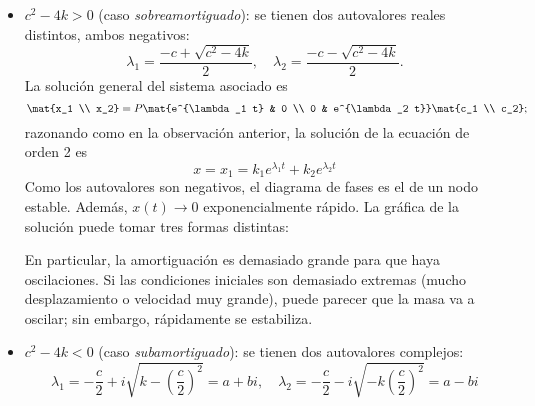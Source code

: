 \documentclass[../main.tex]{subfiles}
\begin{document}
  \begin{itemize}
  \item \(c^2-4k > 0\) (caso \emph{sobreamortiguado}): se tienen dos autovalores
    reales distintos, ambos negativos:
    \[\lambda_1 = \frac{-c + \sqrt{c^2-4k}}{2}, \quad \lambda_2 = \frac{-c -
        \sqrt{c^2-4k}}{2}.\]
    La solución general del sistema asociado es
    \[\mat{x_1 \\ x_2} = P \mat{e^{\lambda_1 t} & 0 \\ 0 & e^{\lambda_2 t}} \mat{c_1
        \\ c_2};\]
    razonando como en la observación anterior, la solución de la ecuación de
    orden 2 es
    \[x = x_1 = k_1e^{\lambda_1 t} + k_2e^{\lambda_2 t}\]
    Como los autovalores son negativos, el diagrama de fases es el de un nodo
    estable. Además, \(x(t) \to 0\) exponencialmente rápido. La gráfica de la
    solución puede tomar tres formas distintas:
    \begin{figure}[ht]
      \centering
      \begin{subfigure}{0.33\textwidth}
        \centering
      \end{subfigure}%
      \begin{subfigure}{0.33\textwidth}
        \centering
      \end{subfigure}%
      \begin{subfigure}{0.33\textwidth}
        \centering
      \end{subfigure}%
    \end{figure}

    En particular, la amortiguación es demasiado grande para que haya
    oscilaciones. Si las condiciones iniciales son demasiado extremas (mucho
    desplazamiento o velocidad muy grande), puede parecer que la masa va a
    oscilar; sin embargo, rápidamente se estabiliza.
  \item \(c^2 - 4k < 0\) (caso \emph{subamortiguado}): se tienen dos autovalores
    complejos:
    \[\lambda_1 = -\frac{c}{2}+i\sqrt{k-\left(\frac{c}{2}\right)^2} = a + bi, \quad
      \lambda_2 = -\frac{c}{2}-i\sqrt{-k\left(\frac{c}{2}\right)^2} = a - bi\]


\end{itemize}
\end{document}
